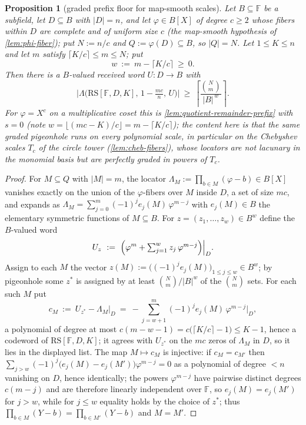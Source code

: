 \documentclass[11pt]{article}
\newtheorem{proposition}[theorem]{Proposition}
\theoremstyle{definition}
\theoremstyle{remark}
\newcommand{\F}{\mathbb{F}}
\newcommand{\B}{B}
\newcommand{\RS}{\mathrm{RS}}
\newcommand{\Lst}{\Lambda}
\begin{document}
\begin{proposition}[graded prefix floor for map-smooth scales]\label{prop:graded-prefix-floor}
Let $\B\subseteq\F$ be a subfield, let $D\subseteq\B$ with $|D|=n$, and let $\varphi\in\B[X]$ of degree $c\ge2$ whose fibers within $D$ are complete and of uniform size $c$ (the map-smooth hypothesis of \cref{lem:phi-fiber}); put $N:=n/c$ and $Q:=\varphi(D)\subseteq\B$, so $|Q|=N$. Let $1\le K\le n$ and let $m$ satisfy $\lceil K/c\rceil\le m\le N$; put
\[
w\ :=\ m-\lceil K/c\rceil\ \ge\ 0 .
\]
Then there is a $\B$-valued received word $U:D\to\B$ with
\[
\bigl|\Lst\bigl(\RS[\F,D,K],\,1-\tfrac{mc}{n},\,U\bigr)\bigr|
\ \ge\
\left\lceil\frac{\binom Nm}{|\B|^{\,w}}\right\rceil .
\]
For $\varphi=X^c$ on a multiplicative coset this is \cref{lem:quotient-remainder-prefix} with $s=0$ (note $w=\lfloor(mc-K)/c\rfloor=m-\lceil K/c\rceil$); the content here is that the same graded pigeonhole runs on every polynomial scale, in particular on the Chebyshev scales $T_c$ of the circle tower (\cref{lem:cheb-fibers}), whose locators are not lacunary in the monomial basis but are perfectly graded in powers of $T_c$.
\end{proposition}

\begin{proof}
For $M\subseteq Q$ with $|M|=m$, the locator $\Lambda_M:=\prod_{b\in M}(\varphi-b)\in\B[X]$ vanishes exactly on the union of the $\varphi$-fibers over $M$ inside $D$, a set of size $mc$, and expands as $\Lambda_M=\sum_{j=0}^m(-1)^je_j(M)\,\varphi^{m-j}$ with $e_j(M)\in\B$ the elementary symmetric functions of $M\subseteq\B$. For $z=(z_1,\dots,z_w)\in\B^w$ define the $\B$-valued word
\[
U_z\ :=\ \Bigl(\varphi^m+\textstyle\sum_{j=1}^{w}z_j\,\varphi^{m-j}\Bigr)\Big|_D .
\]
Assign to each $M$ the vector $z(M):=\bigl((-1)^je_j(M)\bigr)_{1\le j\le w}\in\B^w$; by pigeonhole some $z^*$ is assigned by at least $\binom Nm/|\B|^w$ of the $\binom Nm$ sets. For each such $M$ put
\[
c_M\ :=\ U_{z^*}-\Lambda_M\big|_D\ =\ -\sum_{j=w+1}^{m}(-1)^je_j(M)\,\varphi^{m-j}\Big|_D ,
\]
a polynomial of degree at most $c(m-w-1)=c\bigl(\lceil K/c\rceil-1\bigr)\le K-1$, hence a codeword of $\RS[\F,D,K]$; it agrees with $U_{z^*}$ on the $mc$ zeros of $\Lambda_M$ in $D$, so it lies in the displayed list. The map $M\mapsto c_M$ is injective: if $c_M=c_{M'}$ then $\sum_{j>w}(-1)^j\bigl(e_j(M)-e_j(M')\bigr)\varphi^{m-j}=0$ as a polynomial of degree $<n$ vanishing on $D$, hence identically; the powers $\varphi^{m-j}$ have pairwise distinct degrees $c(m-j)$ and are therefore linearly independent over $\F$, so $e_j(M)=e_j(M')$ for $j>w$, while for $j\le w$ equality holds by the choice of $z^*$; thus $\prod_{b\in M}(Y-b)=\prod_{b\in M'}(Y-b)$ and $M=M'$.
\end{proof}
\end{document}
